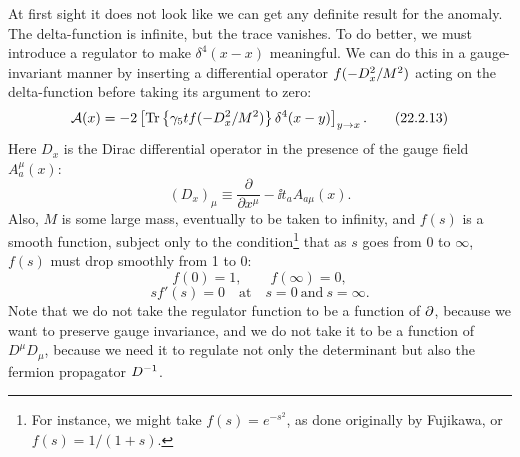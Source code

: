 At first sight it does not look like we can get any definite result for the
anomaly. The delta-function is infinite, but the trace vanishes. To do
better, we must introduce a regulator to make $\delta^4(x-x)$ meaningful.
We can do this in a gauge-invariant manner by inserting a differential
operator $f(-\sl{D}_x^2/M^2)$ acting on the delta-function before taking
its argument to zero:
\begin{equation}
 \mathcal A(x)=-2\left[
  \operatorname{Tr}\left\{\gamma_5t
  f(-\sl{D}_x^2/M^2)\right\}\delta^4(x-y)
 \right]_{y\to x}.
 \tag{22.2.13}\label{eq:22.2.13}
\end{equation}
Here $D_x$ is the Dirac differential operator in the presence of the gauge
field $A_a^\mu(x)$:
\begin{equation}
 (D_x)_\mu\equiv\frac{\partial}{\partial x^\mu}
 -\ii t_a A_{a\mu}(x).
 \tag{22.2.14}\label{eq:22.2.14}
\end{equation}
Also, $M$ is some large mass, eventually to be taken to infinity, and
$f(s)$ is a smooth function, subject only to the condition\footnote{For
instance, we might take $f(s)=e^{-s^2}$, as done originally by Fujikawa,
or $f(s)=1/(1+s)$.} that as $s$ goes from 0 to $\infty$, $f(s)$ must drop
smoothly from 1 to 0:
\begin{equation}
 f(0)=1,\qquad f(\infty)=0,
 \tag{22.2.15}\label{eq:22.2.15}
\end{equation}
\begin{equation}
 sf'(s)=0\quad\text{at}\quad s=0\ \text{and}\ s=\infty.
 \tag{22.2.16}\label{eq:22.2.16}
\end{equation}
Note that we do not take the regulator function to be a function of
$\sl{\partial}$, because we want to preserve gauge invariance, and we do
not take it to be a function of $D^\mu D_\mu$, because we need it to
regulate not only the determinant but also the fermion propagator
$\sl{D}^{-1}$.

